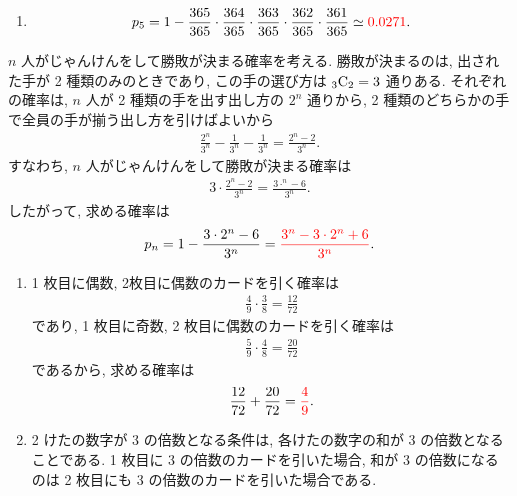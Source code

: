 \begin{qenumerate}
{\begin{enumerate}
{\begin{align}
				\end{align}
				となるから
				\begin{align}
					p_{n} = \red{1 - \frac{\permu{365}{n}}{365^{n}}} = \red{1 - \frac{365!}{365^{n}\cdot(365 - n)!}}
				\end{align}
			}
			\item{
				\begin{align}
					p_{5} = 1 - \frac{365}{365}\cdot\frac{364}{365}\cdot\frac{363}{365}\cdot\frac{362}{365}\cdot\frac{361}{365} \simeq \textcolor{red}{0.0271}.
				\end{align}
			}
		\end{enumerate}
	}
	\item{
		$n$ 人がじゃんけんをして勝敗が決まる確率を考える.
		勝敗が決まるのは, 出された手が 2 種類のみのときであり, この手の選び方は ${{}_{3}\mathrm{C}_{2}} = 3$ 通りある.
		それぞれの確率は, $n$ 人が 2 種類の手を出す出し方の $2^{n}$ 通りから, 2 種類のどちらかの手で全員の手が揃う出し方を引けばよいから
		\begin{align}
			\frac{2^{n}}{3^{n}} - \frac{1}{3^{n}} - \frac{1}{3^{n}} = \frac{2^{n} - 2}{3^{n}}.
		\end{align}
		すなわち, $n$ 人がじゃんけんをして勝敗が決まる確率は
		\begin{align}
			3\cdot\frac{2^{n} - 2}{3^{n}} = \frac{3\cdot ^{n} - 6}{3^{n}}.
		\end{align}
		したがって, 求める確率は
		\begin{align}
			p_{n} = 1 - \frac{3\cdot 2^{n} - 6}{3^{n}} = \textcolor{red}{\frac{3^{n} - 3\cdot 2^{n} + 6}{3^{n}}}.
		\end{align}
	}
	\item{
		\begin{enumerate}
			\item{
				1 枚目に偶数, 2枚目に偶数のカードを引く確率は
				\begin{align}
					\frac{4}{9}\cdot\frac{3}{8} = \frac{12}{72}
				\end{align}
				であり, 1 枚目に奇数, 2 枚目に偶数のカードを引く確率は
				\begin{align}
					\frac{5}{9}\cdot\frac{4}{8} = \frac{20}{72}
				\end{align}
				であるから, 求める確率は
				\begin{align}
					\frac{12}{72} + \frac{20}{72} = \textcolor{red}{\frac{4}{9}}.
				\end{align}
			}
			\item{
				2 けたの数字が 3 の倍数となる条件は, 各けたの数字の和が 3 の倍数となることである.
				1 枚目に 3 の倍数のカードを引いた場合, 和が 3 の倍数になるのは 2 枚目にも 3 の倍数のカードを引いた場合である.
}
\end{enumerate}}
\end{qenumerate}
